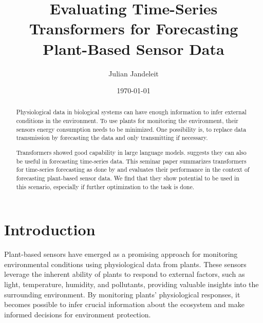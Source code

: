\documentclass[11pt,a4paper]{article}
\title{Evaluating Time-Series Transformers for Forecasting Plant-Based Sensor Data}
\author{Julian Jandeleit}
\date{\today}
\begin{document}
\maketitle

\begin{abstract}
\noindent
Physiological data in biological systems can have enough information to infer external conditions in the environment.
To use plants for monitoring the environment, their sensors energy consumption needs to be minimized.
One possibility is, to replace data transmission by forecasting the data and only transmitting if necessary.

Transformers showed good capability in large language models.
\citet{wu_2020} suggests they can also be useful in forecasting time-series data.
This seminar paper summarizes transformers for time-series forecasting as done by \citet{wu_2020} and evaluates their performance in the context of forecasting plant-based sensor data.
We find that they show potential to be used in this scenario, especially if further optimization to the task is done.
\end{abstract}

\section{Introduction}
Plant-based sensors have emerged as a promising approach for monitoring environmental conditions using physiological data from plants. 
These sensors leverage the inherent ability of plants to respond to external factors, such as light, temperature, humidity, and pollutants, providing valuable insights into the surrounding environment. 
By monitoring plants' physiological responses, it becomes possible to infer crucial information about the ecosystem and make informed decisions for environment protection.
\end{document}
